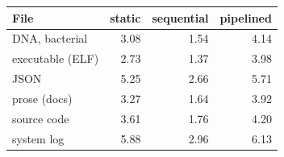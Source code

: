 \begin{tabular}{@{}lrrr@{}}
\toprule
File & static & sequential & pipelined \\
\midrule
DNA, bacterial & 3.08 & 1.54 & 4.14 \\
executable (ELF) & 2.73 & 1.37 & 3.98 \\
JSON & 5.25 & 2.66 & 5.71 \\
prose (docs) & 3.27 & 1.64 & 3.92 \\
source code & 3.61 & 1.76 & 4.20 \\
system log & 5.88 & 2.96 & 6.13 \\
\bottomrule
\end{tabular}
